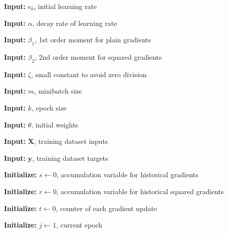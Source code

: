 \documentclass{article}
\begin{document}
    \setlength{\interspacetitleruled}{-.4pt}
    \begin{algorithm}

    
    \textbf{Input:}
    $\epsilon_{0}$, initial learning rate
    
    \textbf{Input:}
    $\alpha$, decay rate of learning rate
    
    \textbf{Input:}
    $\beta_1$, 1st order moment for plain gradients
    
    \textbf{Input:}
    $\beta_2$, 2nd order moment for squared gradients
    
    \textbf{Input:}
    $\zeta$, small constant to avoid zero division
    
    \textbf{Input:}
    $m$, minibatch size
    
	\textbf{Input:}
    $k$, epoch size
    
    \textbf{Input:}
    $\theta$, initial weights
     
    \textbf{Input:}
    $\mathbf{X}$, training dataset inputs
    
    \textbf{Input:}
    $\mathbf{y}$, training dataset targets
    
    \textbf{Initialize:}
    $s \gets 0$, accumulation variable for historical gradients
    
	\textbf{Initialize:}
    $r \gets 0$, accumulation variable for historical squared gradients

	\textbf{Initialize:}
	$t \gets 0$, counter of each gradient update    
    
    \textbf{Initialize:}
	$j \gets 1$, current epoch
		
\end{algorithm}
\end{document}
